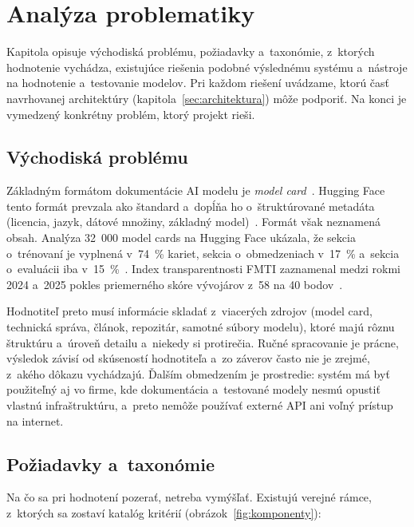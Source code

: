 \section{Analýza problematiky}
\label{sec:analyza}

Kapitola opisuje východiská problému, požiadavky a~taxonómie, z~ktorých
hodnotenie vychádza, existujúce riešenia podobné výslednému systému
a~nástroje na hodnotenie a~testovanie modelov. Pri každom riešení uvádzame,
ktorú časť navrhovanej architektúry (kapitola~\ref{sec:architektura}) môže
podporiť. Na konci je vymedzený konkrétny problém, ktorý projekt rieši.

\subsection{Východiská problému}
\label{sec:vychodiska}

Základným formátom dokumentácie AI modelu je \emph{model card}~\cite{mitchell2019}.
Hugging Face tento formát prevzala ako štandard a~dopĺňa ho
o~štruktúrované metadáta (licencia, jazyk, dátové množiny, základný
model)~\cite{hf-model-cards}. Formát však neznamená obsah. Analýza 32~000
model cards na Hugging Face ukázala, že sekcia o~trénovaní je vyplnená
v~74~\% kariet, sekcia o~obmedzeniach v~17~\% a~sekcia o~evaluácii iba
v~15~\%~\cite{liang2024}. Index transparentnosti FMTI zaznamenal medzi
rokmi 2024 a~2025 pokles priemerného skóre vývojárov z~58 na 40
bodov~\cite{wan2025}.

Hodnotiteľ preto musí informácie skladať z~viacerých zdrojov (model card,
technická správa, článok, repozitár, samotné súbory modelu), ktoré majú
rôznu štruktúru a~úroveň detailu a~niekedy si protirečia. Ručné spracovanie
je prácne, výsledok závisí od skúseností hodnotiteľa a~zo záverov často nie
je zrejmé, z~akého dôkazu vychádzajú. Ďalším obmedzením je prostredie:
systém má byť použiteľný aj vo firme, kde dokumentácia a~testované modely
nesmú opustiť vlastnú infraštruktúru, a~preto nemôže používať externé API
ani voľný prístup na internet.

\subsection{Požiadavky a~taxonómie}
\label{sec:standardy}

Na čo sa pri hodnotení pozerať, netreba vymýšľať. Existujú verejné rámce,
z~ktorých sa zostaví katalóg kritérií (obrázok~\ref{fig:komponenty}):

